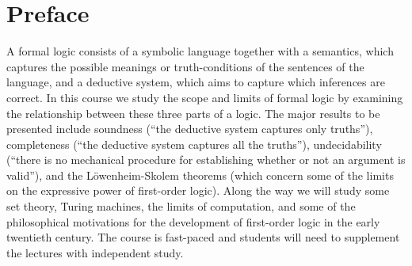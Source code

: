 \chapter{Preface}

A formal logic consists of a symbolic language together with a semantics, which captures the possible meanings or truth-conditions of the sentences of the language, and a deductive system, which aims to capture which inferences are correct. In this course we study the scope and limits of formal logic by examining the relationship between these three parts of a logic. The major results to be presented include soundness (``the deductive system captures only truths''), completeness (``the deductive system captures all the truths''), undecidability (``there is no mechanical procedure for establishing whether or not an argument is valid''), and the L\"owenheim-Skolem theorems (which concern some of the limits on the expressive power of first-order logic). Along the way we will study some set theory, Turing machines, the limits of computation, and some of the philosophical motivations for the development of first-order logic in the early twentieth century. The course is fast-paced and students will need to supplement the lectures with independent study. 

